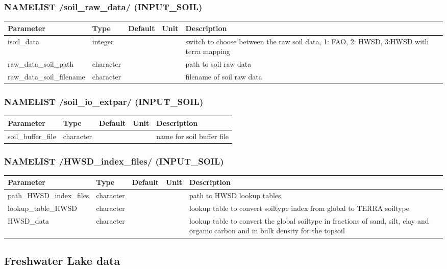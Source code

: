 \documentclass[a4paper,10pt,DIV14,BCOR1cm,titlepage,twoside]{scrartcl}
\providecommand{\tabularnewline}{\\}
\begin{document}
\subsubsection*{NAMELIST /soil\_raw\_data/ (INPUT\_SOIL)}

\begin{longtable}{|p{4cm}|p{1.5cm}|p{1.5cm}|p{1cm}|p{6cm}|}
\hline 
\textbf{Parameter}& \textbf{Type}& \textbf{Default}& \textbf{Unit}& \textbf{Description}
\tabularnewline
\hline
\endhead
\hline
isoil\_data & integer & & & switch to choose between the raw soil data, 1: FAO, 2: HWSD, 3:HWSD with terra mapping \tabularnewline
\hline
raw\_data\_soil\_path & character & &  & path to soil raw data \tabularnewline
\hline 
raw\_data\_soil\_filename & character & &  & filename of soil raw data \tabularnewline
\hline
\bottomrule
\end{longtable}

\subsubsection*{NAMELIST /soil\_io\_extpar/ (INPUT\_SOIL)}
\begin{longtable}{|p{4cm}|p{1.5cm}|p{1.5cm}|p{1cm}|p{6cm}|}
\hline 
\textbf{Parameter}& \textbf{Type}& \textbf{Default}& \textbf{Unit}& \textbf{Description}
\tabularnewline
\hline
\endhead
\hline
soil\_buffer\_file & character & &  & name for soil buffer file
\tabularnewline
\hline
\bottomrule
\end{longtable}

\subsubsection*{NAMELIST /HWSD\_index\_files/ (INPUT\_SOIL)}
\begin{longtable}{|p{4cm}|p{1.5cm}|p{1.5cm}|p{1cm}|p{6cm}|}
\hline 
\textbf{Parameter}& \textbf{Type}& \textbf{Default}& \textbf{Unit}& \textbf{Description}
\tabularnewline
\hline
\endhead
\hline
path\_HWSD\_index\_files & character & &  & path to HWSD lookup tables
\tabularnewline
\hline 
lookup\_table\_HWSD & character & &  & lookup table to convert soiltype index from global to TERRA soiltype 
\tabularnewline
\hline
HWSD\_data & character & &  & lookup table to convert the global soiltype in fractions of sand, silt, clay and organic carbon and in bulk density for the topsoil 
\tabularnewline
\hline
\bottomrule
\end{longtable}

\subsection{Freshwater Lake data}\label{namelist_input_for_extpar_flake}
\end{document}
